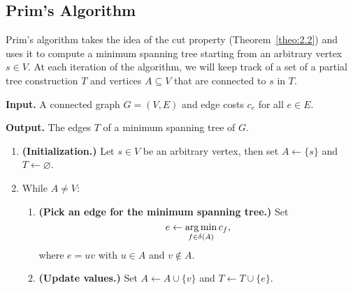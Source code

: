 \subsection{Prim's Algorithm}\label{subsec:2.3}
Prim's algorithm takes the idea of the cut property (Theorem~\ref{theo:2.2}) 
and uses it to compute a minimum spanning tree starting from an arbitrary 
vertex $s \in V$. At each iteration of the algorithm, we will keep track of a 
set of a partial tree construction $T$ and vertices $A \subseteq V$ that are 
connected to $s$ in $T$. 

\begin{mdframed}[
    linewidth=1pt,
    linecolor=black,
    bottomline=false,topline=false,rightline=false,
    innerrightmargin=0pt,innertopmargin=0pt,innerbottommargin=0pt,
    innerleftmargin=1em,%
    skipabove=0.75\baselineskip
]
{\bf Input.} A connected graph $G = (V, E)$ and edge costs $c_e$ for 
all $e \in E$. 

{\bf Output.} The edges $T$ of a minimum spanning tree of $G$.
\begin{enumerate}[leftmargin=1.75cm, label={Step \arabic*.}]
    \item {\bf (Initialization.)} Let $s \in V$ be an arbitrary vertex, 
    then set $A \gets \{s\}$ and $T \gets \varnothing$.

    \item While $A \neq V$:
    \begin{enumerate}[label={Step 2.\arabic*.}]
        \item {\bf (Pick an edge for the minimum spanning tree.)} 
        Set 
        \[ e \gets \operatorname*{arg\,min}_{f \in \delta(A)} c_f, \] 
        where $e = uv$ with $u \in A$ and $v \notin A$.  
        \item {\bf (Update values.)} Set $A \gets A \cup \{v\}$ and 
        $T \gets T \cup \{e\}$. 
    \end{enumerate}
\end{enumerate}
\end{mdframed}\vspace{-0.15cm}

